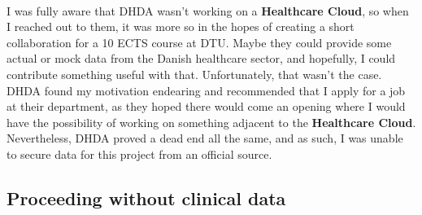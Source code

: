 \\
I was fully aware that DHDA wasn't working on a \textbf{Healthcare Cloud}, so when I reached out to them, it was more so in the hopes of creating a short collaboration for a 10 ECTS course at DTU. Maybe they could provide some actual or mock data from the Danish healthcare sector, and hopefully, I could contribute something useful with that. Unfortunately, that wasn't the case. DHDA found my motivation endearing and recommended that I apply for a job at their department, as they hoped there would come an opening where I would have the possibility of working on something adjacent to the \textbf{Healthcare Cloud}. Nevertheless, DHDA proved a dead end all the same, and as such, I was unable to secure data for this project from an official source. 

\subsection{Proceeding without clinical data}

